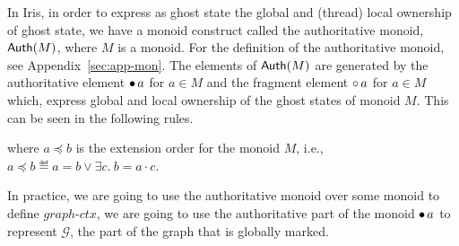 \documentclass[]{scrartcl}
\newcommand{\globprot}{\mathit{graph\text{-}ctx}}
\begin{document}
In Iris, in order to express as ghost state the global and (thread) local
ownership of ghost state, we have a monoid construct called the
authoritative monoid, $\textsf{Auth}(M)$, where $M$ is a monoid.
For the definition of the authoritative monoid, see Appendix~\ref{sec:app-mon}.
The elements of $\textsf{Auth}(M)$ are generated by the authoritative element
$\mathord{\bullet}\, a$ for $a \in M$ and the fragment element $\mathord{\circ}\, a$ for $a \in M$
which, express global and local ownership of the ghost states of monoid $M$.
This can be seen in the following rules.
where $a \preceq b$ is the extension order for the monoid $M$, i.e., $a \preceq b \eqdef a = b \lor \exists c.~ b = a \cdot c$.

In practice, we are going to use the authoritative monoid over some monoid to define $\globprot$, we are going to use the authoritative part
of the monoid $\mathord{\bullet}\, a$ to represent $\mathcal{G}$, the part of the graph
that is globally marked.
\end{document}
